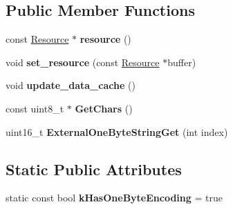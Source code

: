 \subsection*{Public Member Functions}
\begin{DoxyCompactItemize}
\item 
const \hyperlink{classv8_1_1_string_1_1_external_one_byte_string_resource}{Resource} $\ast$ {\bfseries resource} ()\hypertarget{classv8_1_1internal_1_1_external_one_byte_string_aa7ab45556afe97f8fb8d017872a4d1f7}{}\label{classv8_1_1internal_1_1_external_one_byte_string_aa7ab45556afe97f8fb8d017872a4d1f7}

\item 
void {\bfseries set\+\_\+resource} (const \hyperlink{classv8_1_1_string_1_1_external_one_byte_string_resource}{Resource} $\ast$buffer)\hypertarget{classv8_1_1internal_1_1_external_one_byte_string_a3fd1a6197b0ecd8c768c5dcd100a9fcc}{}\label{classv8_1_1internal_1_1_external_one_byte_string_a3fd1a6197b0ecd8c768c5dcd100a9fcc}

\item 
void {\bfseries update\+\_\+data\+\_\+cache} ()\hypertarget{classv8_1_1internal_1_1_external_one_byte_string_a4daf879e8b7254221da94dfabe7c48a6}{}\label{classv8_1_1internal_1_1_external_one_byte_string_a4daf879e8b7254221da94dfabe7c48a6}

\item 
const uint8\+\_\+t $\ast$ {\bfseries Get\+Chars} ()\hypertarget{classv8_1_1internal_1_1_external_one_byte_string_a6b3e8e097552d2729b1364da56fbeb7f}{}\label{classv8_1_1internal_1_1_external_one_byte_string_a6b3e8e097552d2729b1364da56fbeb7f}

\item 
uint16\+\_\+t {\bfseries External\+One\+Byte\+String\+Get} (int index)\hypertarget{classv8_1_1internal_1_1_external_one_byte_string_acb296167eaa5c365607ec04871fa1f93}{}\label{classv8_1_1internal_1_1_external_one_byte_string_acb296167eaa5c365607ec04871fa1f93}

\end{DoxyCompactItemize}
\subsection*{Static Public Attributes}
\begin{DoxyCompactItemize}
\item 
static const bool {\bfseries k\+Has\+One\+Byte\+Encoding} = true\hypertarget{classv8_1_1internal_1_1_external_one_byte_string_a1cf34a0b111fb41fca7f45c50157ee8c}{}\label{classv8_1_1internal_1_1_external_one_byte_string_a1cf34a0b111fb41fca7f45c50157ee8c}

\end{DoxyCompactItemize}
